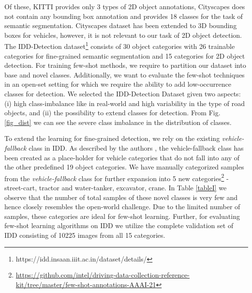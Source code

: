 \documentclass[letterpaper]{article} %
\begin{document}
Of these, KITTI provides only 3 types of 2D object annotations, Cityscapes does not contain any bounding box annotation and provides 18 classes for the task of semantic segmentation. Cityscapes dataset has been extended to 3D bounding boxes for vehicles, however, it is not relevant to our task of 2D object detection. The IDD-Detection dataset\footnote{https://idd.insaan.iiit.ac.in/dataset/details/} consists of 30 object categories with 26 trainable categories for fine-grained semantic segmentation and 15 categories for 2D object detection. For training few-shot methods, we require to partition our dataset into base and novel classes. Additionally, we want to evaluate the few-shot techniques in an open-set setting for which we require the ability to add low-occurrence classes for detection. We selected the IDD-Detection Dataset given two aspects: (i) high class-imbalance like in real-world and high variability in the type of road objects, and (ii) the possibility to extend classes for detection. From Fig. \ref{fig_dist} we can see the severe class imbalance in the distribution of classes. 

To extend the learning for fine-grained detection, we rely on the existing  \emph{vehicle-fallback} class in IDD. As described by the authors \cite{idd}, the vehicle-fallback class has been created as a place-holder for vehicle categories that do not fall into any of the other predefined 19 object categories. We have manually categorized samples from the \emph{vehicle-fallback} class for further expansion into 5 new categories\footnote{\url{https://github.com/intel/driving-data-collection-reference-kit/tree/master/few-shot-annotations-AAAI-21}} -  street-cart, tractor and water-tanker, excavator, crane. In Table \ref{tableI} we observe that the number of total samples of these novel classes is very few and hence closely resembles the open-world challenge. Due to the limited number of samples, these categories are ideal for few-shot learning. Further, for evaluating few-shot learning algorithms on IDD we utilize the complete validation set of IDD consisting of 10225 images from all 15 categories.
\end{document}
